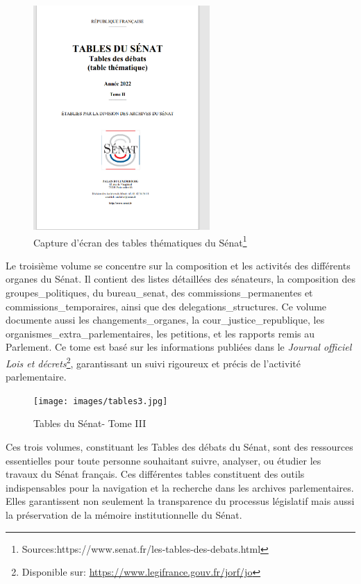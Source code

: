 \begin{figure}[H]
    \centering
    \includegraphics[width=0.6\textwidth]{images/tables thématiques .png}
    \caption{Capture d'écran des tables thématiques du Sénat\protect\footnote{Sources:https://www.senat.fr/les-tables-des-debats.html}}
\end{figure}

Le troisième volume se concentre sur la composition et les activités des différents organes du Sénat. Il contient des listes détaillées des sénateurs, la composition des \gls{groupes_politiques}, du \gls{bureau_senat}, des \gls{commissions_permanentes} et \gls{commissions_temporaires}, ainsi que des \gls{delegations_structures}. Ce volume documente aussi les \gls{changements_organes}, la \gls{cour_justice_republique}, les \gls{organismes_extra_parlementaires}, les \gls{petitions}, et les \gls{rapports} remis au Parlement. Ce tome est basé sur les informations publiées dans le \textit{Journal officiel Lois et décrets}\footnote{Disponible sur: \url{https://www.legifrance.gouv.fr/jorf/jo}}, garantissant un suivi rigoureux et précis de l’activité parlementaire.
\begin{figure}
    \centering
    \texttt{[image: images/tables3.jpg]}
    \caption{Tables du Sénat- Tome III}
\end{figure}
Ces trois volumes, constituant les Tables des débats du Sénat, sont des ressources essentielles pour toute personne souhaitant suivre, analyser, ou étudier les travaux du Sénat français. Ces différentes tables constituent des outils indispensables pour la navigation et la recherche dans les archives parlementaires. Elles garantissent non seulement la transparence du processus législatif mais aussi la préservation de la mémoire institutionnelle du Sénat.

